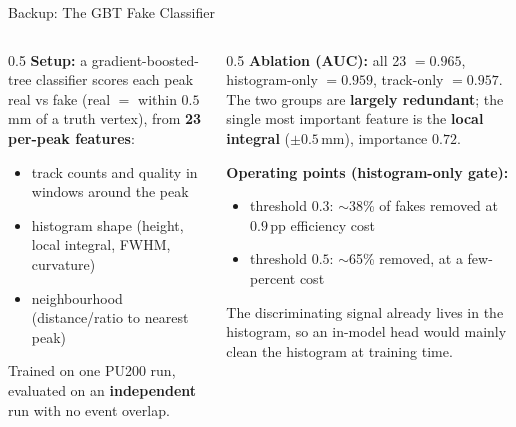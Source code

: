\documentclass[xcolor=table,aspectratio=169]{beamer}
\begin{document}
\begin{frame}{Backup: The GBT Fake Classifier}
    \begin{columns}[c]
        \begin{column}{0.5\linewidth}
            \small
            \textbf{Setup:} a gradient-boosted-tree classifier scores each peak real vs
            fake (real $=$ within $0.5$\,mm of a truth vertex), from \textbf{23 per-peak features}:
            \begin{itemize}\setlength\itemsep{0.2em}
                \item track counts and quality in windows around the peak
                \item histogram shape (height, local integral, FWHM, curvature)
                \item neighbourhood (distance/ratio to nearest peak)
            \end{itemize}
            \vspace{0.35em}
            Trained on one PU200 run, evaluated on an \textbf{independent} run with no event overlap.
        \end{column}
        \begin{column}{0.5\linewidth}
            \small
            \textbf{Ablation (AUC):} all 23 $=0.965$, histogram-only $=0.959$, track-only $=0.957$.
            The two groups are \textbf{largely redundant}; the single most important feature is the
            \textbf{local integral} ($\pm0.5$\,mm), importance $0.72$.
            \vspace{0.4em}

            \textbf{Operating points (histogram-only gate):}
            \begin{itemize}\setlength\itemsep{0.2em}
                \item threshold $0.3$: $\sim$38\% of fakes removed at $0.9$\,pp efficiency cost
                \item threshold $0.5$: $\sim$65\% removed, at a few-percent cost
            \end{itemize}
            \vspace{0.35em}
            {\footnotesize\textcolor{black!55}{The discriminating signal already lives in
            the histogram, so an in-model head would mainly clean the histogram at training time.}}
        \end{column}
    \end{columns}
\end{frame}
\end{document}
